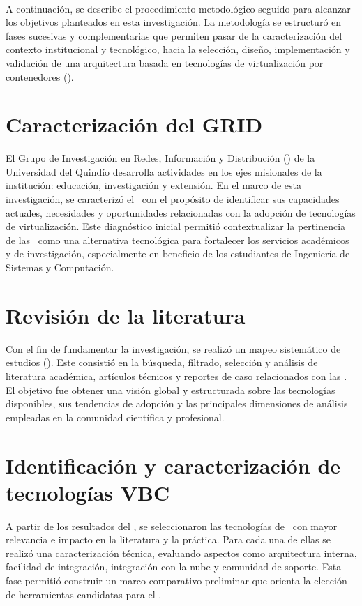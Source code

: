 \label{cap:desarrolloMetodologico}
\mbox{}\\
A continuación, se describe el procedimiento metodológico seguido para alcanzar los objetivos planteados en esta investigación. La metodología se estructuró en fases sucesivas y complementarias que permiten pasar de la caracterización del contexto institucional y tecnológico, hacia la selección, diseño, implementación y validación de una arquitectura basada en tecnologías de virtualización por contenedores (\VBC).

\section{Caracterización del GRID}
El Grupo de Investigación en Redes, Información y Distribución (\GRID) de la Universidad del Quindío desarrolla actividades en los ejes misionales de la institución: educación, investigación y extensión. En el marco de esta investigación, se caracterizó el \GRID\ con el propósito de identificar sus capacidades actuales, necesidades y oportunidades relacionadas con la adopción de tecnologías de virtualización. Este diagnóstico inicial permitió contextualizar la pertinencia de las \VBC\ como una alternativa tecnológica para fortalecer los servicios académicos y de investigación, especialmente en beneficio de los estudiantes de Ingeniería de Sistemas y Computación.

\section{Revisión de la literatura}
Con el fin de fundamentar la investigación, se realizó un mapeo sistemático de estudios (\SMS). Este consistió en la búsqueda, filtrado, selección y análisis de literatura académica, artículos técnicos y reportes de caso relacionados con las \VBC. El objetivo fue obtener una visión global y estructurada sobre las tecnologías disponibles, sus tendencias de adopción y las principales dimensiones de análisis empleadas en la comunidad científica y profesional.

\section{Identificación y caracterización de tecnologías VBC}
A partir de los resultados del \SMS, se seleccionaron las tecnologías de \VBC\ con mayor relevancia e impacto en la literatura y la práctica. Para cada una de ellas se realizó una caracterización técnica, evaluando aspectos como arquitectura interna, facilidad de integración, integración con la nube y comunidad de soporte. Esta fase permitió construir un marco comparativo preliminar que orienta la elección de herramientas candidatas para el \GRID.

